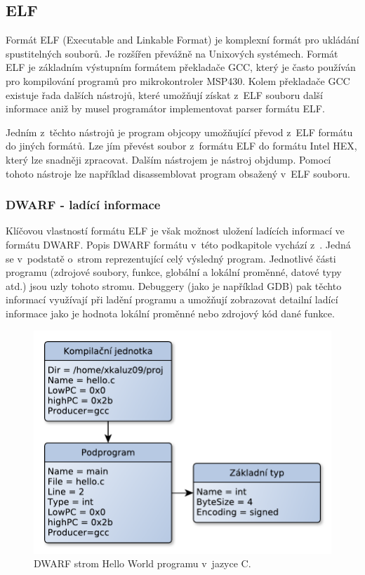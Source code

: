 \subsection{ELF}

Formát ELF (Executable and Linkable Format) je komplexní formát pro ukládání spustitelných souborů. Je rozšířen převážně na Unixových systémech. Formát ELF je základním výstupním formátem překladače GCC, který je často používán pro kompilování programů pro mikrokontroler MSP430. Kolem překladače GCC existuje řada dalších nástrojů, které umožňují získat z~ELF souboru další informace aniž by musel programátor implementovat parser formátu ELF. \cite{elf}

Jedním z~těchto nástrojů je program objcopy umožňující převod z~ELF formátu do jiných formátů. Lze jím převést soubor z~formátu ELF do formátu Intel HEX, který lze snadněji zpracovat. Dalším nástrojem je nástroj objdump. Pomocí tohoto nástroje lze například disassemblovat program obsažený v~ELF souboru.

\subsubsection{DWARF - ladící informace}

Klíčovou vlastností formátu ELF je však možnost uložení ladících informací ve formátu DWARF. Popis DWARF formátu v~této podkapitole vychází z~\cite{dwarf}. Jedná se v~podstatě o~strom reprezentující celý výsledný
program. Jednotlivé části programu (zdrojové soubory, funkce, globální a lokální proměnné, datové typy atd.) jsou uzly tohoto stromu. Debuggery (jako je například GDB) pak těchto informací využívají při ladění programu a umožňují zobrazovat detailní ladící informace jako je hodnota lokální proměnné nebo zdrojový kód dané funkce.

\begin{figure}[ht]
\centering
\includegraphics[trim=0cm 0cm 0cm 0cm, scale=0.7]{fig/dwarf}
\caption{DWARF strom Hello World programu v~jazyce C.}
\label{fig:dwarf}
\end{figure}

